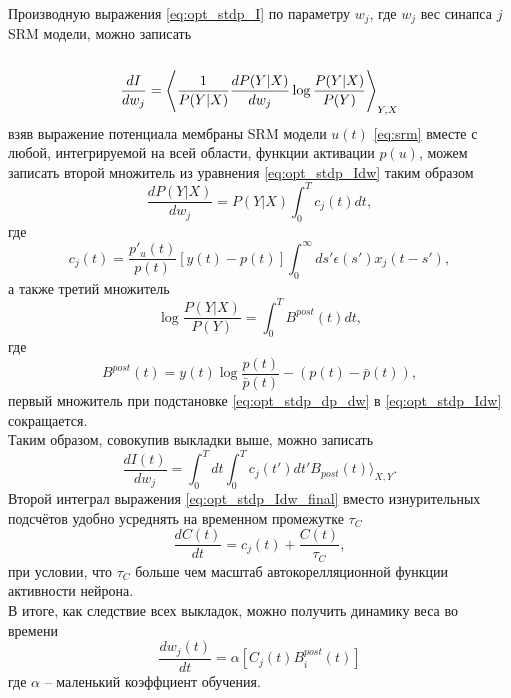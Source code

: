 \documentclass[a4paper,10pt]{article}
\def\la{\left\langle\rule{0pt}{3em}}
\def\ra{\right\rangle}
\begin{document}
\indent Производную выражения \eqref{eq:opt_stdp_I} по параметру $w_{j}$, где $w_{j}$ вес синапса $j$ SRM модели, можно записать
\begin{equation}\label{eq:opt_stdp_Idw}
\frac{dI}{dw_j} = \la \frac{1}{P(Y|X)}\frac{dP(Y|X)}{dw_{j}}\log\frac{P(Y|X)}{P(Y)} \ra_{Y,X}
\end{equation} 
взяв выражение потенциала мембраны SRM модели $u(t)$ \eqref{eq:srm} вместе с любой, интегрируемой на всей области, функции активации $p(u)$, можем записать второй множитель из уравнения \eqref{eq:opt_stdp_Idw} таким образом
\begin{equation}\label{eq:opt_stdp_dp_dw}
\frac{dP(Y|X)}{dw_{j}} = P(Y|X)\int_{0}^{T} c_{j}(t)dt,
\end{equation} 
где
\begin{equation}
c_{j}(t) = \frac{p'_{u}(t)}{p(t)}[y(t)-p(t)]\int_{0}^{\infty}ds'\epsilon(s') x_{j}(t-s'),
\end{equation} 
а также третий множитель 
\begin{equation}
\log\frac{P(Y|X)}{P(Y)} = \int_{0}^{T}B^{post}(t)dt,
\end{equation}
где
\begin{equation}
B^{post}(t) = y(t)\log \frac{p(t)}{\bar{p}(t)} - (p(t)-\bar{p}(t)),
\end{equation} 
первый множитель при подстановке \eqref{eq:opt_stdp_dp_dw} в \eqref{eq:opt_stdp_Idw} сокращается.\\
\indent Таким образом, совокупив выкладки выше, можно записать\\
\begin{equation}\label{eq:opt_stdp_Idw_final}
\frac{dI(t)}{dw_j} = \int_{0}^{T} dt \int_{0}^{T} c_{j}(t')dt' B_{post}(t) \rangle _{X,Y}.
\end{equation}
\indent Второй интеграл выражения \eqref{eq:opt_stdp_Idw_final} вместо изнурительных подсчётов удобно усреднять на временном промежутке $\tau_{C}$ 
\begin{equation}
\frac{dC(t)}{dt} = c_{j}(t) + \frac{C(t)}{\tau_{C}},
\end{equation}
при условии, что $\tau_{C}$ больше чем масштаб автокорелляционной функции активности нейрона.\\
\indent В итоге, как следствие всех выкладок, можно получить динамику веса во времени
\begin{equation}\label{eq:opt_stdp_dw_dt}
\frac{dw_{j}(t)}{dt} = \alpha[C_{j}(t)B^{post}_{i}(t)]
\end{equation}
где $\alpha$ -- маленький коэффциент обучения.\\
\end{document}
